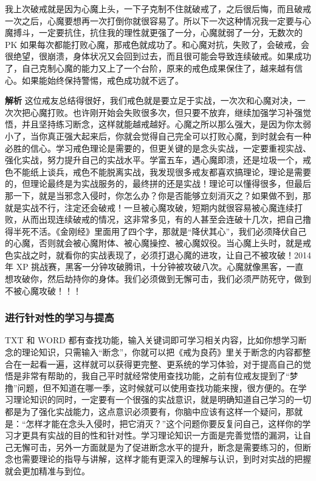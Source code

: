 \begin{case}
    我上次破戒就是因为心魔上头，一下子克制不住就破戒了，之后很后悔，而且破戒一次之后，心魔要想再一次打倒你就很容易了。所以下一次这种情况我一定要与心魔搏斗，一定要抗住，抗住我的理性就更强了一分，心魔就弱了一分，无数次的 PK 如果每次都能打败心魔，那戒色就成功了。和心魔对抗，失败了，会破戒，会很绝望，很崩溃，身体状况又会回到过去，而且很可能会导致连续破戒。如果成功了，自己克制心魔的能力又上了一个台阶，原来的戒色成果保住了，越来越有信心。如果能始终保持警惕，戒色成功就不远了。

    \textbf{解析} 这位戒友总结得很好，我们戒色就是要立足于实战，一次次和心魔对决，一次次把心魔打败。也许刚开始会失败很多次，但只要不放弃，继续加强学习补强觉悟，并且坚持练习断念，这样就能越戒越好。心魔之所以那么强大，是因为你太弱小了，当你真正强大起来后，你就会觉得自己完全可以打败心魔，到时就会有一种必胜的信心。学习戒色理论是需要的，但更关键的是念头实战，一定要重视实战、强化实战，努力提升自己的实战水平。学富五车，遇心魔即溃，还是垃圾一个，戒色不能纸上谈兵，戒色不能脱离实战，我发现很多戒友都喜欢搞理论，理论是需要的，但理论最终是为实战服务的，最终拼的还是实战！理论可以懂得很多，但最后那一下，就是当邪念入侵时，你怎么办？你是否能够立刻消灭之？如果做不到，那就是实战不行，注定还会破戒！一旦被心魔攻破，短期内就很容易被心魔连续打败，从而出现连续破戒的情况，这非常多见，有的人甚至会连破十几次，把自己撸得半死不活。《金刚经》里面用了四个字，那就是“降伏其心”，我们必须降伏自己的心魔，否则就会被心魔附体、被心魔操控、被心魔奴役。当心魔上头时，就是戒色实战之时，就看你的实战表现了，必须打退心魔的进攻，让自己不被攻破！2014 年 XP 挑战赛，黑客一分钟攻破腾讯，十分钟被攻破八次。心魔就像黑客，一直想攻破你，然后劫持你的身体。我们必须做到无懈可击，我们必须严防死守，做到不被心魔攻破！！！
\end{case}

\subsubsection{进行针对性的学习与提高}

TXT 和 WORD 都有查找功能，输入关键词即可学习相关内容，比如你想学习断念的理论知识，只需输入“断念”，你就可以把《戒为良药》里关于断念的内容都整合在一起看一遍，这样就可以获得更完整、更系统的学习体验，对于提高自己的觉悟是非常有帮助的，我自己平时就经常使用查找功能，之前有位戒友提到了“梦撸”问题，但不知道在哪一季，这时候就可以使用查找功能来搜，很方便的。在学习理论知识的同时，一定要有一个很强的实战意识，就是明确知道自己学习的一切都是为了强化实战能力，这点意识必须要有，你脑中应该有这样一个疑问，那就是：“怎样才能在念头入侵时，把它消灭？”这个问题你要反复问自己，这样你的学习才更具有实战的目的性和针对性。学习理论知识一方面是完善觉悟的漏洞，让自己无懈可击，另外一方面就是为了促进断念水平的提升，断念是需要练习的，但断念也需要理论的指导与讲解，这样才能有更深入的理解与认识，到时对实战的把握就会更加精准与到位。

